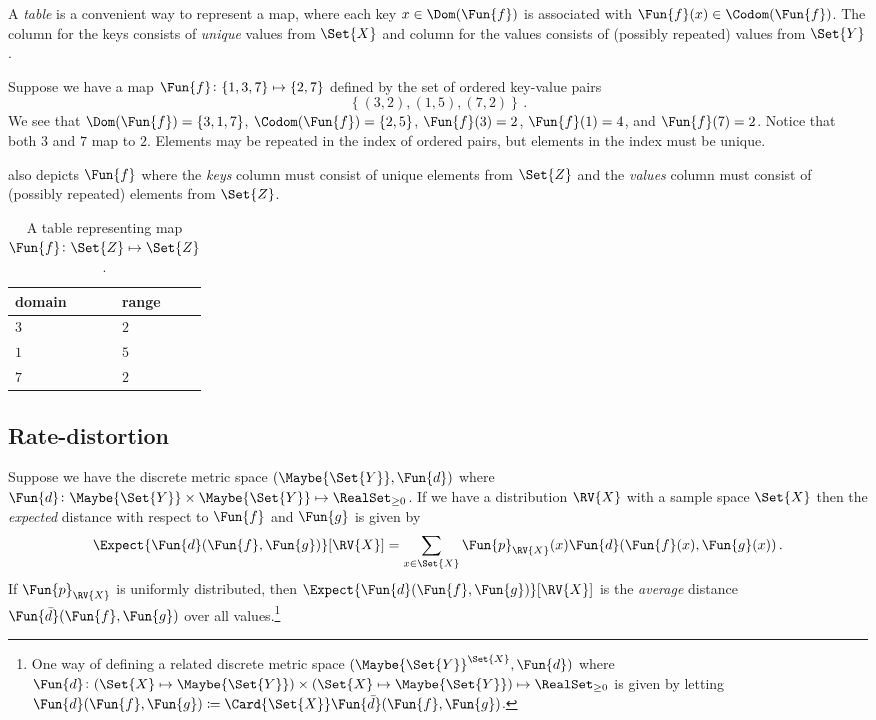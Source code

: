 \documentclass[ ../main.tex]{subfiles}
\begin{document}
A \emph{table} is a convenient way to represent a map, where each key $x \in \Dom(\Fun{f})$ is associated with $\Fun{f}(x) \in \Codom(\Fun{f})$. The column for the keys consists of \emph{unique} values from $\Set{X}$ and column for the values consists of (possibly repeated) values from $\Set{Y}$.
\begin{example}
	Suppose we have a map $\Fun{f} \colon \{1,3,7\} \mapsto \{2,7\}$ defined by the set of ordered key-value pairs
	\begin{equation}
	\left\{(3,2),(1,5),(7,2)\right\}\,.
	\end{equation}
	We see that $\Dom(\Fun{f}) = \{3,1,7\}$, $\Codom(\Fun{f}) = \{2,5\}$, $\Fun{f}(3) = 2$, $\Fun{f}(1) = 4$, and $\Fun{f}(7) = 2$. Notice that both $3$ and $7$ map to $2$. Elements may be repeated in the  index of ordered pairs, but elements in the  index must be unique.
	
	 also depicts $\Fun{f}$ where the \emph{keys} column must consist of unique elements from $\Set{Z}$ and the \emph{values} column must consist of (possibly repeated) elements from $\Set{Z}$.
	\begin{table}[h]
		\centering
		\caption{A table representing map $\Fun{f} \colon \Set{Z} \mapsto \Set{Z}$.}
		\label{tbl:tabfunc}
		\begin{tabular}{@{} l l @{}} 
			\toprule
			domain & range\\
			\midrule
			$3$ & $2$\\
			$1$ & $5$\\
			$7$ & $2$\\
			\bottomrule
		\end{tabular}
	\end{table}
\end{example}

\subsection{Rate-distortion}
\label{sec:error}
Suppose we have the discrete metric space $(\Maybe{\Set{Y}}, \Fun{d})$ where $\Fun{d} \colon \Maybe{\Set{Y}} \times \Maybe{\Set{Y}} \mapsto \RealSet_{\geq 0}$.
If we have a distribution $\RV{X}$ with a sample space $\Set{X}$ then the \emph{expected} distance with respect to $\Fun{f}$ and $\Fun{g}$ is given by
\begin{equation}
\Expect{\Fun{d}(\Fun{f},\Fun{g})}[\RV{X}] = \sum_{x \in \Set{X}} \Fun{p}_{\RV{X}}(x) \Fun{d}(\Fun{f}(x),\Fun{g}(x))\,.
\end{equation}
If $\Fun{p}_{\RV{X}}$ is uniformly distributed, then $\Expect{\Fun{d}(\Fun{f},\Fun{g})}[\RV{X}]$ is the \emph{average} distance $\Fun{\bar{d}}(\Fun{f},\Fun{g})$ over all values.\footnote{One way of defining a related discrete metric space $(\Maybe{\Set{Y}}^{\Set{X}}, \Fun{d})$ where $\Fun{d} \colon (\Set{X} \mapsto \Maybe{\Set{Y}}) \times (\Set{X} \mapsto \Maybe{\Set{Y}}) \mapsto \RealSet_{\geq 0}$ is given by letting $\Fun{d}(\Fun{f},\Fun{g}) \coloneqq \Card{\Set{X}} \Fun{\bar{d}}(\Fun{f},\Fun{g})$.}
\end{document}
